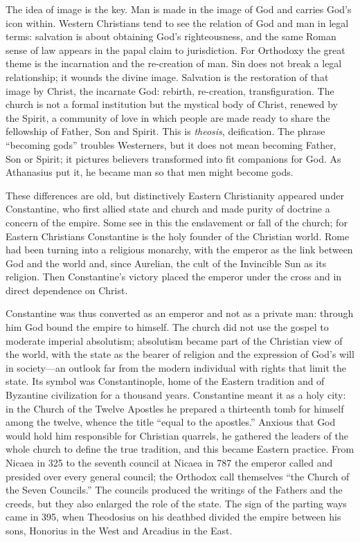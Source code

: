 The idea of image is the key. Man is made in the image of God and carries God's icon within. Western
Christians tend to see the relation of God and man in legal terms: salvation is about obtaining God's
righteousness, and the same Roman sense of law appears in the papal claim to jurisdiction. For
Orthodoxy the great theme is the incarnation and the re-creation of man. Sin does not break a legal
relationship; it wounds the divine image. Salvation is the restoration of that image by Christ, the
incarnate God: rebirth, re-creation, transfiguration. The church is not a formal institution but the
mystical body of Christ, renewed by the Spirit, a community of love in which people are made ready to
share the fellowship of Father, Son and Spirit. This is \emph{theosis}, deification. The phrase
``becoming gods'' troubles Westerners, but it does not mean becoming Father, Son or Spirit; it pictures
believers transformed into fit companions for God. As Athanasius put it, he became man so that men
might become gods.

These differences are old, but distinctively Eastern Christianity appeared under Constantine, who
first allied state and church and made purity of doctrine a concern of the empire. Some see in this
the enslavement or fall of the church; for Eastern Christians Constantine is the holy founder of the
Christian world. Rome had been turning into a religious monarchy, with the emperor as the link between
God and the world and, since Aurelian, the cult of the Invincible Sun as its religion. Then
Constantine's victory placed the emperor under the cross and in direct dependence on Christ.

Constantine was thus converted as an emperor and not as a private man: through him God bound the empire to
himself. The church did not use the gospel to moderate imperial absolutism; absolutism became part of
the Christian view of the world, with the state as the bearer of religion and the expression of God's
will in society---an outlook far from the modern individual with rights that limit the state. Its
symbol was Constantinople, home of the Eastern tradition and of Byzantine civilization for a thousand
years. Constantine meant it as a holy city: in the Church of the Twelve Apostles he prepared a
thirteenth tomb for himself among the twelve, whence the title ``equal to the apostles.'' Anxious that
God would hold him responsible for Christian quarrels, he gathered the leaders of the whole church to
define the true tradition, and this became Eastern practice. From Nicaea in 325 to the seventh council
at Nicaea in 787 the emperor called and presided over every general council; the Orthodox call
themselves ``the Church of the Seven Councils.'' The councils produced the writings of the Fathers and
the creeds, but they also enlarged the role of the state. The sign of the parting ways came in 395,
when Theodosius on his deathbed divided the empire between his sons, Honorius in the West and Arcadius
in the East.

